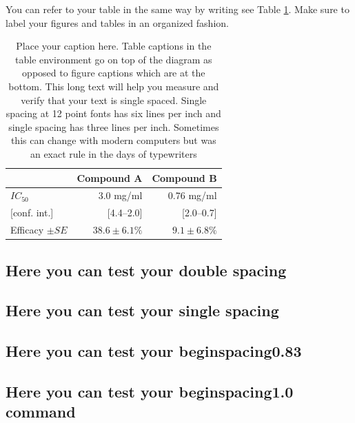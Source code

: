 You can refer to your table in the same way by writing see Table \ref{table:1.1}. Make sure to label your figures and tables in an organized fashion.

\begin{table}[H] %
    \centering
    \caption{Place your caption here. Table captions in the table environment go on top of the diagram as opposed to figure captions which are at the bottom. This long text will help you measure and verify that your text is single spaced. Single spacing at 12 point fonts has six lines per inch and single spacing has three lines per inch. Sometimes this can change with modern computers but was an exact rule in the days of typewriters}
    \label{table:1.1}
    \begin{tabular}{@{}lrr@{}}
    \toprule
    & Compound A & Compound B \\
    \midrule
    $IC_{50}$ & 3.0 mg/ml & 0.76 mg/ml \\
    {[conf. int.]} & [4.4–2.0] & [2.0–0.7] \\
    Efficacy $\pm SE$ & $38.6 \pm 6.1\%$ & $9.1 \pm 6.8\%$ \\ 
    \bottomrule
\end{tabular}
\end{table}


\subsection{Here you can test your double spacing}
\doublespacing
\lipsum[1]

\subsection{Here you can test your single spacing}
\singlespacing
\lipsum[1]

\subsection{Here you can test your  beginspacing{0.83}}
\begin{spacing}{0.83}
\lipsum[1]
\end{spacing}

\subsection{Here you can test your beginspacing{1.0} command}
\begin{spacing}{1.0}
\lipsum[1]
\end{spacing}